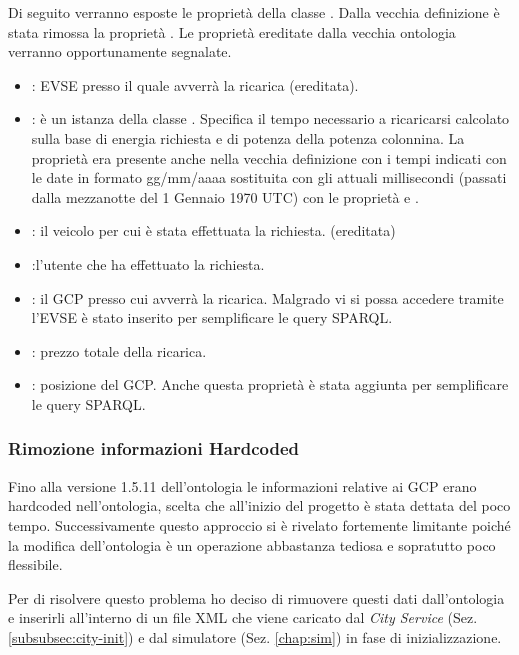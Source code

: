 Di seguito verranno esposte le proprietà della classe . Dalla vecchia definizione è stata rimossa la proprietà . Le proprietà ereditate dalla vecchia ontologia verranno opportunamente segnalate.

\begin{itemize}
	\item {}: EVSE presso il quale avverrà la ricarica (ereditata).
	\item {}: è un istanza della classe . Specifica il tempo necessario a ricaricarsi calcolato sulla base di energia richiesta e di potenza della potenza colonnina. La proprietà era presente anche nella vecchia definizione con i tempi indicati con le date in formato gg/mm/aaaa sostituita con gli attuali millisecondi (passati dalla mezzanotte del 1 Gennaio 1970 UTC) con le proprietà  e .
	\item {}: il veicolo per cui è stata effettuata la richiesta. (ereditata)
	\item {}:l'utente che ha effettuato la richiesta.
	\item {}: il GCP presso cui avverrà la ricarica. Malgrado vi si possa accedere tramite l'EVSE è stato inserito per semplificare le query SPARQL.
	\item {}: prezzo totale della ricarica.
	\item {}: posizione del GCP. Anche questa proprietà è stata aggiunta per semplificare le query SPARQL.
\end{itemize}


\subsubsection{Rimozione informazioni Hardcoded}

Fino alla versione 1.5.11 dell'ontologia le informazioni relative ai GCP erano hardcoded nell'ontologia, scelta che all'inizio del progetto è stata dettata del poco tempo. Successivamente questo approccio si è rivelato fortemente limitante poiché la modifica dell'ontologia è un operazione abbastanza tediosa e sopratutto poco flessibile. 

Per di risolvere questo problema ho deciso di rimuovere questi dati dall'ontologia e inserirli all'interno di un file XML che viene caricato dal \emph{City Service} (Sez. \ref{subsubsec:city-init}) e dal simulatore (Sez. \ref{chap:sim}) in fase di inizializzazione.


